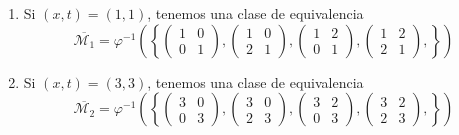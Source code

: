 \documentclass{article}
\begin{document}
\begin{enumerate}
		\begin{enumerate}
			\item Si $(x, t) = (1,1)$, tenemos una clase de equivalencia 
			$$
			\overline{\mathcal{M}_{1}} = 
			\varphi^{-1}\left( 
			\left\{
			\begin{pmatrix}
			1 &0 \\
			0 & 1 
			\end{pmatrix},
			\begin{pmatrix}
			1 & 0 \\
			2 & 1 
			\end{pmatrix},
			\begin{pmatrix}
			1 & 2 \\
			0 & 1 
			\end{pmatrix},
			\begin{pmatrix}
			1 & 2 \\
			2 & 1 
			\end{pmatrix},
			\right\}	
			\right) $$
			
			\item  Si $(x, t) = (3,3)$, tenemos una clase de equivalencia 
			$$
			\overline{\mathcal{M}_{2}} = 
			\varphi^{-1}\left( 
			\left\{
			\begin{pmatrix}
			3 &0 \\
			0 & 3 
			\end{pmatrix},
			\begin{pmatrix}
			3 & 0 \\
			2 & 3 
			\end{pmatrix},
			\begin{pmatrix}
			3 & 2 \\
			0 & 3 
			\end{pmatrix},
			\begin{pmatrix}
			3 & 2 \\
			2 & 3 
			\end{pmatrix},
			\right\}	
			\right) $$
			
		\end{enumerate}
		

\end{enumerate}
\end{document}

